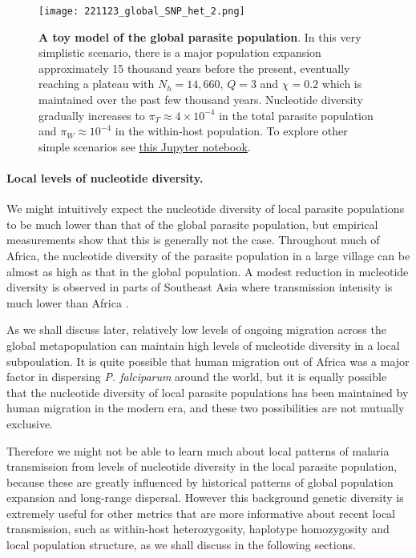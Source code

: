 \documentclass[_main.tex]{subfiles}
\begin{document}
\begin{figure}[h!]
\centering
\texttt{[image: 221123\_global\_SNP\_het\_2.png]}
\caption{\textbf{A toy model of the global parasite population}.  In this very simplistic scenario, there is a major population expansion approximately 15 thousand years before the present, eventually reaching a plateau with $N_h = 14,660$, $Q = 3$ and $\chi = 0.2$ which is maintained over the past few thousand years.  Nucleotide diversity gradually increases to $\pi_T \approx 4 \times 10^{-4}$ in the total parasite population and $\pi_W \approx 10^{-4}$ in the within-host population.  To explore other simple scenarios see \href{https://github.com/d-kwiat/gtg/blob/main/species_history.ipynb}{this Jupyter notebook}.}
\label{fig:main_global_pi_1}
\end{figure}

\paragraph{Local levels of nucleotide diversity.} We might intuitively expect the nucleotide diversity of local parasite populations to be much lower than that of the global parasite population, but empirical measurements show that this is generally not the case.  Throughout much of Africa, the nucleotide diversity of the parasite population in a large village can be almost as high as that in the global population.  A modest reduction in nucleotide diversity is observed in parts of Southeast Asia where transmission intensity is much lower than Africa \cite{MalariaGEN2021,MalariaGEN2023}.  

As we shall discuss later, relatively low levels of ongoing migration across the global metapopulation can maintain high levels of nucleotide diversity in a local subpoulation.  It is quite possible that human migration out of Africa was a major factor in dispersing \textit{P. falciparum} around the world, but it is equally possible that the nucleotide diversity of local parasite populations has been maintained by human migration in the modern era, and these two possibilities are not mutually exclusive.  

Therefore we might not be able to learn much about local patterns of malaria transmission from levels of nucleotide diversity in the local parasite population, because these are greatly influenced by historical patterns of global population expansion and long-range dispersal.  However this background genetic diversity is extremely useful for other metrics that are more informative about recent local transmission, such as within-host heterozygosity, haplotype homozygosity and local population structure, as we shall discuss in the following sections.
\end{document}
